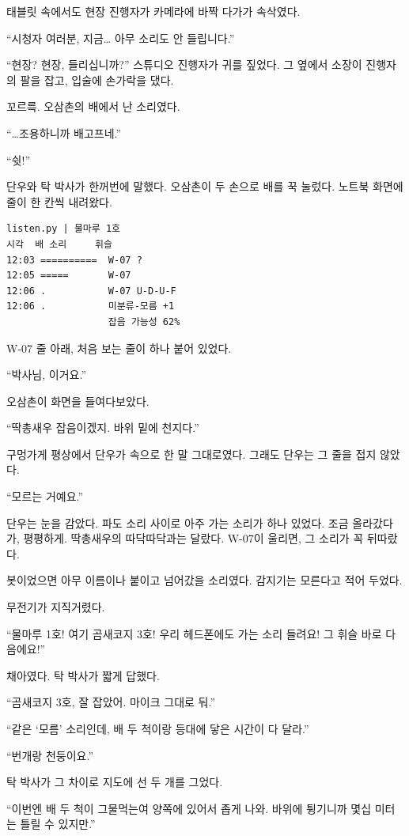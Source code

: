 \documentclass[
  korean,
  letterpaper,
  twoside,
  open=any,
  fontsize=12.5pt,
  headings=small]{scrbook}
\newcommand{\logfont}{\linespread{1}\fontsize{10.8}{15.2}\selectfont}
\begin{document}
태블릿 속에서도 현장 진행자가
카메라에 바짝 다가가 속삭였다.

``시청자 여러분, 지금\ldots{}
아무 소리도 안 들립니다.''

``현장? 현장, 들리십니까?''
스튜디오 진행자가 귀를 짚었다.
그 옆에서 소장이 진행자의 팔을
잡고, 입술에 손가락을 댔다.

꼬르륵. 오삼촌의 배에서 난
소리였다.

``\ldots 조용하니까
배고프네.''

``쉿!''

단우와 탁 박사가 한꺼번에
말했다. 오삼촌이 두 손으로
배를 꾹 눌렀다. 노트북 화면에
줄이 한 칸씩 내려왔다.

\begin{Verbatim}[samepage=true,frame=single,framesep=2.5mm,rulecolor=\color{gray},formatcom=\logfont]
listen.py | 물마루 1호
시각  배 소리     휘슬
12:03 ==========  W-07 ?
12:05 =====       W-07
12:06 .           W-07 U-D-U-F
12:06 .           미분류-모름 +1
                  잡음 가능성 62%
\end{Verbatim}

W-07 줄 아래, 처음 보는 줄이
하나 붙어 있었다.

``박사님, 이거요.''

오삼촌이 화면을 들여다보았다.

``딱총새우 잡음이겠지. 바위
밑에 천지다.''

구멍가게 평상에서 단우가
속으로 한 말 그대로였다.
그래도 단우는 그 줄을 접지
않았다.

``모르는 거예요.''

단우는 눈을 감았다. 파도 소리
사이로 아주 가는 소리가 하나
있었다. 조금 올라갔다가,
평평하게. 딱총새우의
따닥따닥과는 달랐다. W-07이
울리면, 그 소리가 꼭 뒤따랐다.

봇이었으면 아무 이름이나
붙이고 넘어갔을 소리였다.
감지기는 모른다고 적어 두었다.

무전기가 지직거렸다.

``물마루 1호! 여기 곰새코지
3호! 우리 헤드폰에도 가는 소리
들려요! 그 휘슬 바로
다음에요!''

채아였다. 탁 박사가 짧게
답했다.

``곰새코지 3호, 잘 잡았어.
마이크 그대로 둬.''

``같은 `모름' 소리인데, 배 두
척이랑 등대에 닿은 시간이 다
달라.''

``번개랑 천둥이요.''

탁 박사가 그 차이로 지도에 선
두 개를 그었다.

``이번엔 배 두 척이 그물먹는여
양쪽에 있어서 좁게 나와.
바위에 튕기니까 몇십 미터는
틀릴 수 있지만.''
\end{document}
